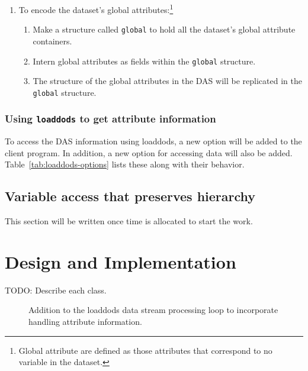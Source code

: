 \documentclass{article}
\begin{document}
\begin{enumerate}
\item To encode the dataset's global attributes:\footnote{Global attribute are
    defined as those attributes that correspond to no variable in the
    dataset.}
\begin{enumerate}
\item Make a structure called \texttt{global} to hold all the dataset's
  global attribute containers.
\item Intern global attributes as fields within the \texttt{global}
  structure.
\item The structure of the global attributes in the DAS will be replicated in
  the \texttt{global} structure.
\end{enumerate}

\end{enumerate}

\subsubsection{Using \texttt{loaddods} to get attribute information}

To access the DAS information using loaddods, a new option will be added to
the client program. In addition, a new option for accessing data will also be
added. Table~\ref{tab:loaddods-options} lists these along with their
behavior.

\subsection{Variable access that preserves hierarchy }
\label{sec:variables}

This section will be written once time is allocated to start the work.

\section{Design and Implementation}
\label{sec:design}

TODO: Describe each class.

\begin{figure}
\begin{center}
\caption{Addition to the loaddods data stream processing loop to incorporate
  handling attribute information.}
\label{fig:loaddods-attr-processing}
\end{center}
\end{figure}
\end{document}

